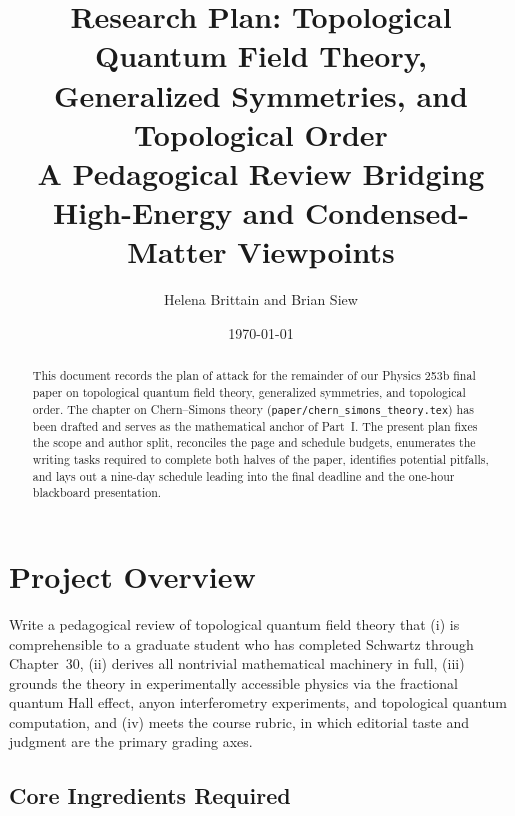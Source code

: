 \documentclass[11pt]{article}
\title{Research Plan: Topological Quantum Field Theory,\\
Generalized Symmetries, and Topological Order\\
{\normalsize A Pedagogical Review Bridging High-Energy and Condensed-Matter Viewpoints}}
\author{Helena Brittain and Brian Siew}
\date{\today}
\begin{document}
\maketitle

\begin{abstract}
This document records the plan of attack for the remainder of our Physics 253b final
paper on topological quantum field theory, generalized symmetries, and topological order.
The chapter on Chern--Simons theory (\texttt{paper/chern\_simons\_theory.tex}) has been
drafted and serves as the mathematical anchor of Part~I. The present plan fixes the scope
and author split, reconciles the page and schedule budgets, enumerates the writing tasks
required to complete both halves of the paper, identifies potential pitfalls, and lays out
a nine-day schedule leading into
the final deadline and the one-hour blackboard presentation.
\end{abstract}

\tableofcontents
\newpage

\section{Project Overview}\label{sec:overview}

\begin{goalbox}
Write a pedagogical review of topological quantum field theory that (i) is comprehensible
to a graduate student who has completed Schwartz \cite{Schwartz2014QFT} through Chapter~30,
(ii) derives all nontrivial mathematical machinery in full, (iii) grounds the theory in
experimentally accessible physics via the fractional quantum Hall effect, anyon
interferometry experiments, and topological quantum computation, and (iv) meets the
course rubric, in which editorial taste and judgment are the primary grading axes.
\end{goalbox}

\subsection{Core Ingredients Required}
\end{document}
